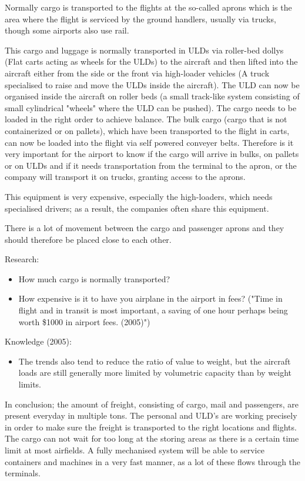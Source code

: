Normally cargo is transported to the flights at the so-called aprons which is the area where the flight is serviced by the ground handlers, usually via trucks, though some airports also use rail.

This cargo and luggage is normally transported in ULDs via roller-bed dollys (Flat carts acting as wheels for the ULDs) to the aircraft and then lifted into the aircraft either from the side or the front via high-loader vehicles (A truck specialised to raise and move the ULDs inside the aircraft).
The ULD can now be organised inside the aircraft on roller beds (a small track-like system consisting of small cylindrical "wheels" where the ULD can be pushed). The cargo needs to be loaded in the right order to achieve balance. The bulk cargo (cargo that is not containerized or on pallets), which have been transported to the flight in carts, can now be loaded into the flight via self powered conveyer belts. Therefore is it very important for the airport to know if the cargo will arrive in bulks, on pallets or on ULDs and if it needs transportation from the terminal to the apron, or the company will transport it on trucks, granting access to the aprons.

This equipment is very expensive, especially the high-loaders, which needs specialised drivers; as a result, the companies often share this equipment.

There is a lot of movement between the cargo and passenger aprons and they should therefore be placed close to each other.%

Research:
\begin{itemize}
\item How much cargo is normally transported?
\item How expensive is it to have you airplane in the airport in fees? ("Time in flight and in transit is most important, a saving of one hour perhaps being worth \$1000 in airport fees. (2005)")
\end{itemize}


Knowledge (2005):
\begin{itemize}
\item The trends also tend to reduce the ratio of value to weight, but the aircraft loads are still generally more limited by volumetric capacity than by weight limits.
\end{itemize}

In conclusion; the amount of freight, consisting of cargo, mail and passengers, are present everyday in multiple tons. The personal and ULD's are working precisely  in order to make sure the freight is transported to the right locations and flights. The cargo can not wait for too long at the storing areas as there is a certain time limit at  most airfields. A fully mechanised system will be able to service containers and machines in a very fast manner, as a lot of these flows through the terminals.
